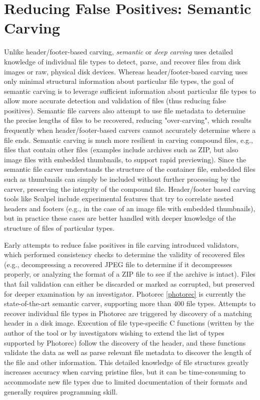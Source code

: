 \section{Reducing False Positives: Semantic Carving}

Unlike header/footer-based carving, \emph{semantic} or \emph{deep carving} uses detailed knowledge of individual file types to detect, parse, and recover files from disk images or raw, physical disk devices.  Whereas header/footer-based carving uses only minimal structural information about particular file types, the goal of semantic carving is to leverage sufficient information about particular file types to allow more accurate detection and validation of files (thus reducing false positives).   Semantic file carvers also attempt to use file metadata to determine the precise lengths of files to be recovered, reducing "over-carving", which results frequently when header/footer-based carvers cannot accurately determine where a file ends.  Semantic carving is much more resilient in carving compound files, e.g., files that contain other files (examples include archives such as ZIP, but also image files with embedded thumbnails, to support rapid previewing).  Since the semantic file carver understands the structure of the container file, embedded files such as thumbnails can simply be included without further processing by the carver, preserving the integrity of the compound file.   Header/footer based carving tools like Scalpel include experimental features that try to correlate nested headers and footers (e.g., in the case of an image file with embedded thumbnails), but in practice these cases are better handled with deeper knowledge of the structure of files of particular types.

Early attempts to reduce false positives in file carving introduced validators, which performed consistency checks to determine the validity of recovered files (e.g., decompressing a recovered JPEG file to determine if it decompresses properly, or analyzing the format of a ZIP file to see if the archive is intact).  Files that fail validation can either be discarded or marked as corrupted, but preserved for deeper examination by an investigator.  Photorec \ref{photorec} is currently the state-of-the-art semantic carver, supporting more than 400 file types.  Attempts to recover individual file types in Photorec are triggered by discovery of a matching header in a disk image.  Execution of file type-specific C functions (written by the author of the tool or by investigators wishing to extend the list of types supported by Photorec) follow the discovery of the header, and these functions validate the data as well as parse relevant file metadata to discover the length of the file and other information.  This detailed knowledge of file structures greatly increases accuracy when carving pristine files, but it can be time-consuming to accommodate new file
types due to limited documentation of their formats and generally requires programming skill.

